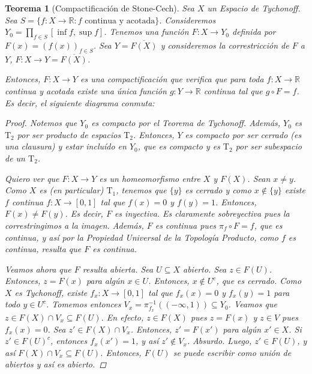 \documentclass[12pt]{book}
\newtheorem{teo}{Teorema}[section]
\theoremstyle{definition}
\newcommand{\RR}{\mathbb{R}}      %
\begin{document}
\begin{teo}[Compactificación de Stone-Cech]
Sea $X$ un Espacio de Tychonoff. Sea $S=\{f:X\to\RR : f\text{ continua y acotada}\}$. Consideremos $Y_0 = \displaystyle\prod_{f\in S} [\inf f, \sup f]$. Tenemos una función $F:X\to Y_0$ definida por $F(x)=(f(x))_{f\in S}$. Sea $Y=\overline{F(X)}$ y consideremos la correstricción de $F$ a $Y$, $F:X\to Y=\overline{F(X)}$.

Entonces, $F:X\to Y$ es una compactificación que verifica que para toda $f:X\to\RR$ continua y acotada existe una única función $g:Y\to\RR$ continua tal que $g\circ F = f$. Es decir, el siguiente diagrama conmuta:
\begin{center}
\end{center}
\begin{proof}
Notemos que $Y_0$ es compacto por el Teorema de Tychonoff. Además, $Y_0$ es $\mathrm{T}_2$ por ser producto de espacios $\mathrm{T}_2$. Entonces, $Y$ es compacto por ser cerrado (es una clausura) y estar incluído en $Y_0$, que es compacto y es $\mathrm{T}_2$ por ser subespacio de un $\mathrm{T}_2$. 

Quiero ver que $F:X\to Y$ es un homeomorfismo entre $X$ y $F(X)$. Sean $x\neq y$. Como $X$ es (en particular) $\mathrm{T}_1$, tenemos que $\{y\}$ es cerrado y como $x\notin \{y\}$ existe $f$ continua $f:X\to [0,1]$ tal que $f(x)=0$ y $f(y)=1$. Entonces, $F(x)\neq F(y)$. Es decir, $F$ es inyectiva. Es claramente sobreyectiva pues la correstringimos a la imagen.
Además, $F$ es continua pues $\pi_f\circ F = f$, que es continua, y así por la Propiedad Universal de la Topología Producto, como $f$ es continua, resulta que $F$ es continua.

Veamos ahora que $F$ resulta abierta. Sea $U\subseteq X$ abierto. Sea $z\in F(U)$. Entonces, $z = F(x)$ para algún $x\in U$. Entonces, $x\notin U^c$, que es cerrado. Como $X$ es Tychonoff, existe $f_x:X\to [0,1]$ tal que $f_x(x)=0$ y $f_x(y)=1$ para todo $y\in U^c$. Tomemos entonces $V_x=\pi_{f_x}^{-1}((-\infty,1))\subseteq Y_0$. Veamos que $z\in F(X)\cap V_x\subseteq F(U)$. En efecto, $z\in F(X)$ pues $z=F(x)$ y $z\in V$ pues $f_x(x)=0$. Sea $z'\in F(X)\cap V_x$. Entonces, $z' = F(x')$ para algún $x'\in X$. Si $z'\in F(U)^c$, entonces $f_x(x')=1$, y así $z'\notin V_x$. Absurdo. Luego, $z'\in F(U)$, y así $F(X)\cap V_x\subseteq F(U)$.  Entonces, $F(U)$ se puede escribir como unión de abiertos y así es abierto.


\end{proof}
\end{teo}
\end{document}
